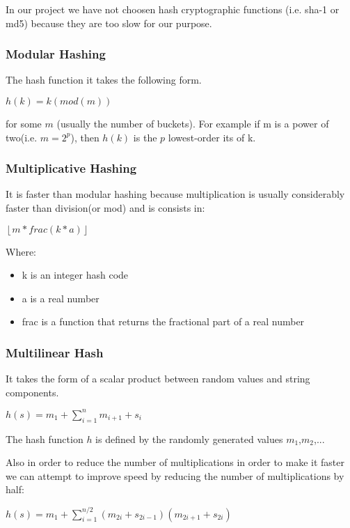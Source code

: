 \documentclass[12pt]{article}
\begin{document}
In our project we have not choosen hash cryptographic functions (i.e. sha-1 or md5) because they are too slow for our purpose.


\subsubsection{Modular Hashing}

The hash function it takes the following form. 

\begin{center} $h(k) = k (mod (m))$ \end{center}

for some $m$ (usually the number of buckets). For example if m is a power of two(i.e. $m = 2^p$), then $h(k)$ is the $p$ lowest-order its of k. 

\subsubsection{Multiplicative Hashing}

It is faster than modular hashing because multiplication is usually considerably faster than division(or mod) and is consists in:
\begin{center}
 $ \left \lfloor m* frac(k*a) \right \rfloor$
\end{center}
Where:
\begin{itemize}
\item k is an integer hash code
\item a is a real number
\item frac is a function that returns the fractional part of a real number
\end{itemize}


\subsubsection{Multilinear Hash}
It takes the form of a scalar product between random values and string components.
\begin{center}
$h(s) = m_1 + \sum_{i=1}^{n} m_{i+1} + s_i$
\end{center}
The hash function $h$ is defined by the randomly generated values $m_1$,$m_2$,...

Also in order to reduce the number of multiplications in order to make it faster we can attempt to improve speed by reducing the number of multiplications by half: 
\begin{center}
 $h(s) = m_1 + \sum_{i=1}^{n/2} (m_{2i} + s_{2i-1})(m_{2i+1} + s_{2i})$
\end{center}
\end{document}

